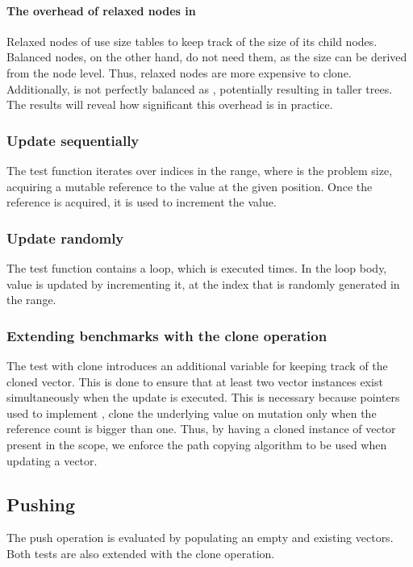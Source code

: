 \paragraph{The overhead of relaxed nodes in \rrbtree{}}
Relaxed nodes of \rrbtree{} use size tables to keep track of the size of its child nodes. Balanced nodes, on the other hand, do not need them, as the size can be derived from the node level. Thus, relaxed nodes are more expensive to clone. Additionally, \rrbtree{} is not perfectly balanced as \rbtree{}, potentially resulting in taller trees. The results will reveal how significant this overhead is in practice.

\subsubsection*{Update sequentially}
The test function iterates over indices in the \range{[0, N)} range, where \n{} is the problem size, acquiring a mutable reference to the value at the given position. Once the reference is acquired, it is used to increment the value.

\subsubsection*{Update randomly}
The test function contains a loop, which is executed \n{} times. In the loop body, value is updated by incrementing it, at the index that is randomly generated in the \range{[0, N)} range.

\subsubsection*{Extending benchmarks with the clone operation}
The test with clone introduces an additional variable for keeping track of the cloned vector. This is done to ensure that at least two vector instances exist simultaneously when the update is executed. This is necessary because \rc{} pointers used to implement \rbtree{}, clone the underlying value on mutation only when the reference count is bigger than one. Thus, by having a cloned instance of vector present in the scope, we enforce the path copying algorithm to be used when updating a vector.

\subsection{Pushing}
The push operation is evaluated by populating an empty and existing vectors. Both tests are also extended with the clone operation.


